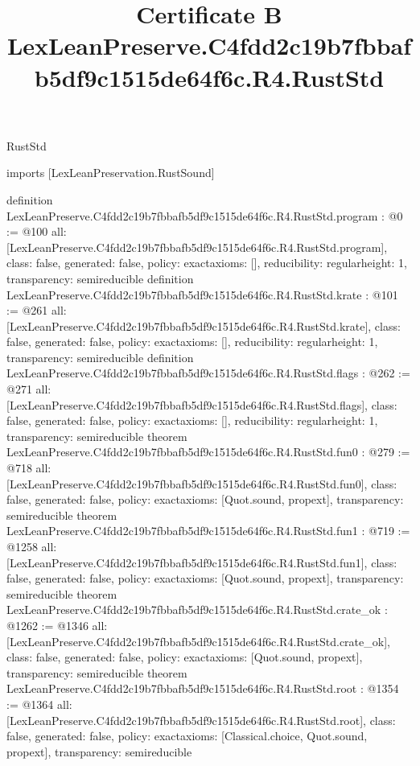 \begin{lexlean}{RustStd}
\title{Certificate B LexLeanPreserve.C4fdd2c19b7fbbafb5df9c1515de64f6c.R4.RustStd}
\begin{coremodule}
imports [LexLeanPreservation.RustSound]

definition LexLeanPreserve.C4fdd2c19b7fbbafb5df9c1515de64f6c.R4.RustStd.program : @0 := @100 {
  all: [LexLeanPreserve.C4fdd2c19b7fbbafb5df9c1515de64f6c.R4.RustStd.program],
  class: false,
  generated: false,
  policy: exact{axioms: []},
  reducibility: regular{height: 1},
  transparency: semireducible
}
definition LexLeanPreserve.C4fdd2c19b7fbbafb5df9c1515de64f6c.R4.RustStd.krate : @101 := @261 {
  all: [LexLeanPreserve.C4fdd2c19b7fbbafb5df9c1515de64f6c.R4.RustStd.krate],
  class: false,
  generated: false,
  policy: exact{axioms: []},
  reducibility: regular{height: 1},
  transparency: semireducible
}
definition LexLeanPreserve.C4fdd2c19b7fbbafb5df9c1515de64f6c.R4.RustStd.flags : @262 := @271 {
  all: [LexLeanPreserve.C4fdd2c19b7fbbafb5df9c1515de64f6c.R4.RustStd.flags],
  class: false,
  generated: false,
  policy: exact{axioms: []},
  reducibility: regular{height: 1},
  transparency: semireducible
}
theorem LexLeanPreserve.C4fdd2c19b7fbbafb5df9c1515de64f6c.R4.RustStd.fun0 : @279 := @718 {
  all: [LexLeanPreserve.C4fdd2c19b7fbbafb5df9c1515de64f6c.R4.RustStd.fun0],
  class: false,
  generated: false,
  policy: exact{axioms: [Quot.sound, propext]},
  transparency: semireducible
}
theorem LexLeanPreserve.C4fdd2c19b7fbbafb5df9c1515de64f6c.R4.RustStd.fun1 : @719 := @1258 {
  all: [LexLeanPreserve.C4fdd2c19b7fbbafb5df9c1515de64f6c.R4.RustStd.fun1],
  class: false,
  generated: false,
  policy: exact{axioms: [Quot.sound, propext]},
  transparency: semireducible
}
theorem LexLeanPreserve.C4fdd2c19b7fbbafb5df9c1515de64f6c.R4.RustStd.crate_ok : @1262 := @1346 {
  all: [LexLeanPreserve.C4fdd2c19b7fbbafb5df9c1515de64f6c.R4.RustStd.crate_ok],
  class: false,
  generated: false,
  policy: exact{axioms: [Quot.sound, propext]},
  transparency: semireducible
}
theorem LexLeanPreserve.C4fdd2c19b7fbbafb5df9c1515de64f6c.R4.RustStd.root : @1354 := @1364 {
  all: [LexLeanPreserve.C4fdd2c19b7fbbafb5df9c1515de64f6c.R4.RustStd.root],
  class: false,
  generated: false,
  policy: exact{axioms: [Classical.choice, Quot.sound, propext]},
  transparency: semireducible
}


\end{coremodule}
\end{lexlean}
